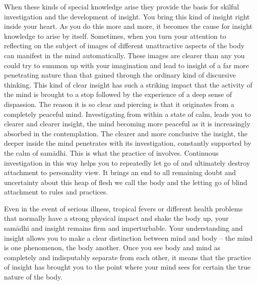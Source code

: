 When these kinds of special knowledge arise they provide the basis for skilful investigation and the development of insight. You bring this kind of insight right inside your heart. As you do this more and more, it becomes the cause for insight knowledge to arise by itself. Sometimes, when you turn your attention to reflecting on the subject of  images of different unattractive aspects of the body can manifest in the mind automatically. These images are clearer than any you could try to summon up with your imagination and lead to insight of a far more penetrating nature than that gained through the ordinary kind of discursive thinking. This kind of clear insight has such a striking impact that the activity of the mind is brought to a stop followed by the experience of a deep sense of dispassion. The reason it is so clear and piercing is that it originates from a completely peaceful mind. Investigating from within a state of calm, leads you to clearer and clearer insight, the mind becoming more peaceful as it is increasingly absorbed in the contemplation. The clearer and more conclusive the insight, the deeper inside the mind penetrates with its investigation, constantly supported by the calm of sam\=adhi. This is what the practice of  involves. Continuous investigation in this way helps you to repeatedly let go of and ultimately destroy attachment to personality view. It brings an end to all remaining doubt and uncertainty about this heap of flesh we call the body and the letting go of blind attachment to rules and practices. 

Even in the event of serious illness, tropical fevers or different health problems that normally have a strong physical impact and shake the body up, your sam\=adhi and insight remains firm and imperturbable. Your understanding and insight allows you to make a clear distinction between mind and body -- the mind is one phenomenon, the body another. Once you see body and mind as completely and indisputably separate from each other, it means that the practice of insight has brought you to the point where your mind sees for certain the true nature of the body. 

